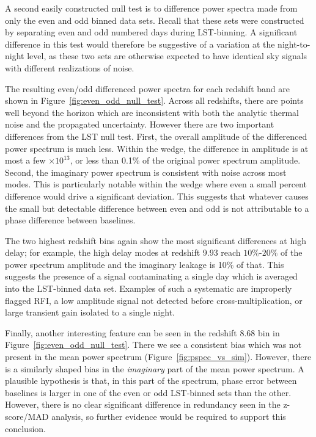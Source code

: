 A second easily constructed null test is to difference
power spectra made from only the even and odd binned data sets.
Recall that these sets were constructed by separating even and odd
numbered days during LST-binning. A significant difference in this test would therefore be suggestive of
a variation at the night-to-night level,
as these two sets are otherwise
expected to have identical sky signals
with different realizations of noise.

The resulting even/odd differenced power spectra for each redshift band
are shown in Figure~\ref{fig:even_odd_null_test}.
Across all redshifts, there are points well beyond the
horizon which are inconsistent with both the analytic thermal noise
and the propagated uncertainty. However there are two important differences
from the LST null test. First, the overall amplitude of the differenced power spectrum is much less. Within the wedge, the
difference in amplitude is at most a few $\times 10^{13}$, or less than 0.1\% of the original power spectrum amplitude.
Second, the imaginary power spectrum is consistent with
noise across most modes. This is particularly notable within the wedge where even a small percent difference would drive a significant deviation. This
 suggests that whatever causes the small but detectable difference between
 even and odd is not attributable to a phase difference between baselines.

The two highest redshift
bins again show the most significant differences at high delay; for example, the high delay modes at redshift 9.93 reach $ 10\%$-$20\% $ of the power spectrum amplitude and the imaginary leakage is 10\% of that. This suggests the presence of a signal contaminating a single day which is averaged into the LST-binned data set.
Examples of such a systematic are improperly flagged RFI, a low amplitude signal not detected before cross-multiplication, or large transient gain isolated to a single night.

Finally, another interesting feature can be seen in the redshift 8.68 bin in Figure~\ref{fig:even_odd_null_test}.
There we see a consistent bias which was not present in the mean power spectrum (Figure~\ref{fig:pspec_vs_sim}).  However, there is a similarly shaped bias in the \emph{imaginary} part of the mean power spectrum. A plausible hypothesis
is that, in this part of the spectrum, phase error between baselines is larger in one of the even or odd LST-binned sets than the other. However, there is no clear significant difference in redundancy seen in the z-score/MAD analysis, so further evidence would be required to support this conclusion.

